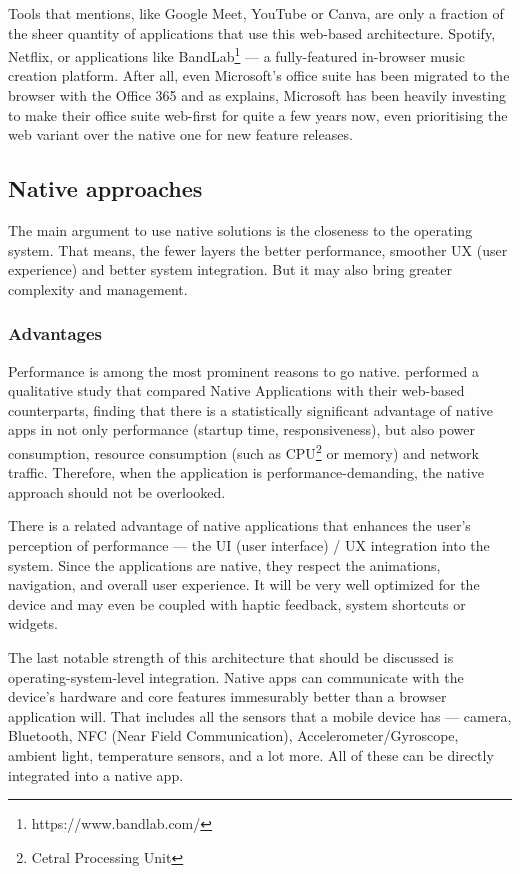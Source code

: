 \documentclass[
  digital,     %
  color,       %
  oneside,     %
  nosansbold,  %
  nocolorbold, %
  lof,         %
  lot,         %
]{fithesis4}
\begin{document}
Tools that \citeauthor{WebAppsReplacingNative} mentions, like Google Meet, YouTube or Canva, are only a fraction of the sheer quantity of applications that use this web-based architecture. Spotify, Netflix, or applications like BandLab\footnote{https://www.bandlab.com/} --- a fully-featured in-browser music creation platform. After all, even Microsoft's office suite has been migrated to the browser with the Office 365 and as \cite{OfficeForWeb} explains, Microsoft has been heavily investing to make their office suite web-first for quite a few years now, even prioritising the web variant over the native one for new feature releases.
\subsection{Native approaches}
The main argument to use native solutions is the closeness to the operating system. That means, the fewer layers the better performance, smoother UX (user experience) and better system integration. But it may also bring greater complexity and management.

\subsubsection{Advantages}
Performance is among the most prominent reasons to go native. \cite{NativeVsWeb} performed a qualitative study that compared Native Applications with their web-based counterparts, finding that there is a statistically significant advantage of native apps in not only performance (startup time, responsiveness), but also power consumption, resource consumption (such as CPU\footnote{Cetral Processing Unit} or memory) and network traffic. Therefore, when the application is performance-demanding, the native approach should not be overlooked. 

There is a related advantage of native applications that enhances the user's perception of performance --- the UI (user interface) / UX integration into the system. Since the applications are native, they respect the animations, navigation, and overall user experience. It will be very well optimized for the device and may even be coupled with haptic feedback, system shortcuts or widgets.

The last notable strength of this architecture that should be discussed is operating-system-level integration. Native apps can communicate with the device's hardware and core features immesurably better than a browser application will. That includes all the sensors that a mobile device has --- camera, Bluetooth, NFC (Near Field Communication), Accelerometer/Gyroscope, ambient light, temperature sensors, and a lot more. All of these can be directly integrated into a native app.
\end{document}
